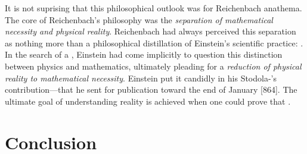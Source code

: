 \documentclass[draft]{article}
\begin{document}
It is not suprising that this philosophical outlook was for Reichenbach anathema. The core of Reichenbach's philosophy was the \emph{separation of mathematical necessity and physical reality}. Reichenbach had always perceived this separation as nothing more than a philosophical distillation of Einstein's scientific practice: . In the search of a \uft, Einstein had come implicitly to question this distinction between physics and mathematics, ultimately pleading for a \emph{reduction of physical reality to mathematical necessity}. Einstein put it candidly in his Stodola-'s contribution---that he sent for publication toward the end of January [864]. The ultimate goal of understanding reality is achieved when one could prove that  \citep[127]{Einstein1929}.




\section{Conclusion}
\end{document}
